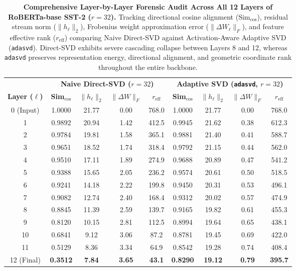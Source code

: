 \documentclass{article}
\begin{document}
\begin{table}[t]
\centering
\caption{\textbf{Comprehensive Layer-by-Layer Forensic Audit Across All 12 Layers of RoBERTa-base SST-2 ($r=32$).} 
Tracking directional cosine alignment ($\text{Sim}_{\cos}$), residual stream norm ($\|h_\ell\|_2$), Frobenius weight approximation error ($\|\Delta W_\ell\|_F$), and feature effective rank ($r_{\text{eff}}$) comparing Naive Direct-SVD against Activation-Aware Adaptive SVD (\texttt{adasvd}). Direct-SVD exhibits severe cascading collapse between Layers 8 and 12, whereas \texttt{adasvd} preserves representation energy, directional alignment, and geometric coordinate rank throughout the entire backbone.}
\label{tab:roberta_layerwise_12}
\small
\setlength{\tabcolsep}{4pt}
\begin{tabular}{c|cccc|cccc}
\toprule
 & \multicolumn{4}{c|}{\textbf{Naive Direct-SVD ($r=32$)}} & \multicolumn{4}{c}{\textbf{Adaptive SVD (\texttt{adasvd}, $r=32$)}} \\
\textbf{Layer ($\ell$)} & \textbf{Sim$_{\cos}$} & \textbf{$\|h_\ell\|_2$} & \textbf{$\|\Delta W\|_F$} & \textbf{$r_{\text{eff}}$} & \textbf{Sim$_{\cos}$} & \textbf{$\|h_\ell\|_2$} & \textbf{$\|\Delta W\|_F$} & \textbf{$r_{\text{eff}}$} \\
\midrule
0 (Input) & 1.0000 & 21.77 & 0.00 & 768.0 & 1.0000 & 21.77 & 0.00 & 768.0 \\
1 & 0.9892 & 20.94 & 1.42 & 412.5 & 0.9945 & 21.62 & 0.38 & 612.3 \\
2 & 0.9784 & 19.81 & 1.58 & 365.1 & 0.9881 & 21.40 & 0.41 & 588.7 \\
3 & 0.9651 & 18.52 & 1.74 & 318.4 & 0.9792 & 21.15 & 0.44 & 562.0 \\
4 & 0.9510 & 17.11 & 1.89 & 274.9 & 0.9688 & 20.89 & 0.47 & 541.2 \\
5 & 0.9388 & 15.65 & 2.05 & 236.2 & 0.9574 & 20.61 & 0.50 & 518.5 \\
6 & 0.9241 & 14.18 & 2.22 & 199.8 & 0.9450 & 20.31 & 0.53 & 496.1 \\
7 & 0.9082 & 12.74 & 2.40 & 168.4 & 0.9312 & 20.02 & 0.57 & 474.9 \\
8 & 0.8845 & 11.39 & 2.59 & 139.7 & 0.9165 & 19.82 & 0.61 & 455.3 \\
9 & 0.8120 & 10.15 & 2.81 & 112.5 & 0.8994 & 19.64 & 0.65 & 438.1 \\
10 & 0.6841 & 9.12 & 3.06 & 87.2 & 0.8781 & 19.45 & 0.69 & 422.0 \\
11 & 0.5129 & 8.36 & 3.34 & 64.9 & 0.8542 & 19.28 & 0.74 & 408.4 \\
12 (Final) & \textbf{0.3512} & \textbf{7.84} & \textbf{3.65} & \textbf{43.1} & \textbf{0.8290} & \textbf{19.12} & \textbf{0.79} & \textbf{395.7} \\
\bottomrule
\end{tabular}
\end{table}
\end{document}
